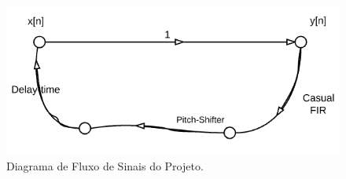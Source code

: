 	\begin{figure}[!h t b]
		\label{signal_principal}
		\centering
		\includegraphics[scale=0.5]{./figuras/fluxo_de_sinais_principal.png}
		\caption{Diagrama de Fluxo de Sinais do Projeto.}	
	\end{figure}
	
	
	
	
	
	


